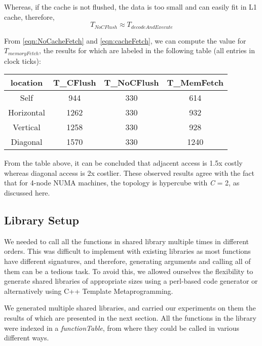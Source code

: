 Whereas, if the cache is not flushed, the data is too small and can easily fit in L1 cache, therefore, 
\begin{dmath}
\label{eqn:cacheFetch}
T_{NoCFlush} \approx T_{decodeAndExecute}
\end{dmath}

From \ref{eqn:NoCacheFetch} and \ref{eqn:cacheFetch}, we can compute the value for $T_{memoryFetch}$, the
results for which are labeled in the following table (all entries in clock ticks):

\begin{center}
\begin{tabular}{c|c|c|c}
\hline
location & T_{CFlush} & T_{NoCFlush} & T_{MemFetch}\\
\hline
Self & 944 & 330 & 614\\
Horizontal & 1262 & 330 & 932 \\
Vertical & 1258 & 330 & 928\\
Diagonal & 1570 & 330 & 1240\\
\hline
\end{tabular}
\end{center}

From the table above, it can be concluded that adjacent access is 1.5x costly whereas diagonal access is
2x costlier. These observed results agree with the fact that for 4-node NUMA machines, the topology is
hypercube with \textit{C} = 2, as discussed here\cite{Drepper07whatevery}.

\subsection{Library Setup}
We needed to call all the functions in shared library multiple times in different orders. This was difficult
to implement with existing libraries as most functions have different signatures, and therefore, generating
arguments and calling all of them can be a tedious task. To avoid this, we allowed ourselves the flexibility
to generate shared libraries of appropriate sizes using a perl-based code generator or alternatively using
C++ Template Metaprogramming.\cite{templateMeta}

We generated multiple shared libraries, and carried our experiments on them the results of which are presented
in the next section. All the functions in the library were indexed in a \textit{functionTable}, from where they
could be called in various different ways.
